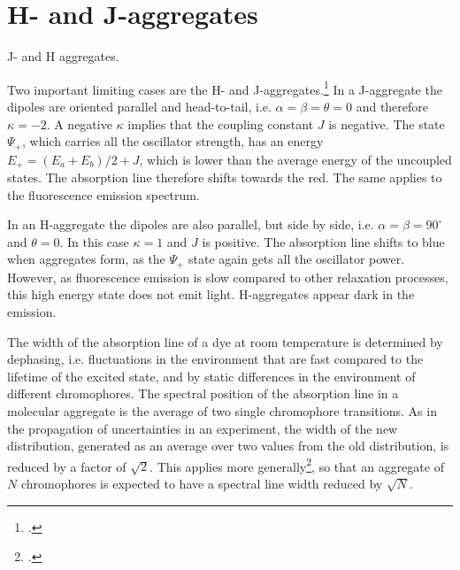\section{H- and J-aggregates}

\begin{marginfigure}

\caption{J- and H aggregates.}
\end{marginfigure}

Two important limiting cases are the H- and J-aggregates.\footcite[chapters 2.1.4.3, 2.2.5.3]{KoehlerBaessler2015} In a J-aggregate the dipoles are oriented parallel and head-to-tail, i.e. $\alpha = \beta = \theta = 0$ and therefore $\kappa = -2$. A negative $\kappa$ implies that the coupling constant $J$ is negative. The state $\Psi_+$, which carries all the oscillator strength, has an energy $E_+ = (E_a + E_b) / 2 + J$, which is lower than the average energy of the uncoupled states. The absorption line therefore shifts towards the red. The same applies to the fluorescence emission spectrum.

In an H-aggregate the dipoles are also parallel, but side by side, i.e. $\alpha = \beta = 90^\circ$ and $\theta = 0$. In this case $\kappa =1$ and $J$ is positive. The absorption line shifts to blue when aggregates form, as the $\Psi_+$ state again gets all the oscillator power. However, as fluorescence emission is slow compared to other relaxation processes, this high energy state does not emit light. H-aggregates appear dark in the emission.

The width of the absorption line of a dye at room temperature is determined by dephasing, i.e. fluctuations in the environment that are fast compared to the lifetime of the excited state, and by static differences in the environment of different chromophores. The spectral position of the absorption line in a molecular aggregate is the average of two single chromophore transitions. As in the propagation of uncertainties in an experiment, the width of the new distribution, generated as an average over two values from the old distribution, is reduced by a factor of $\sqrt{2}$. This applies more generally\footcite{Knapp1984}, so that an aggregate of $N$ chromophores is expected to have a spectral line width reduced by $\sqrt{N}$.







\printbibliography[segment=\therefsegment,heading=subbibliography]


